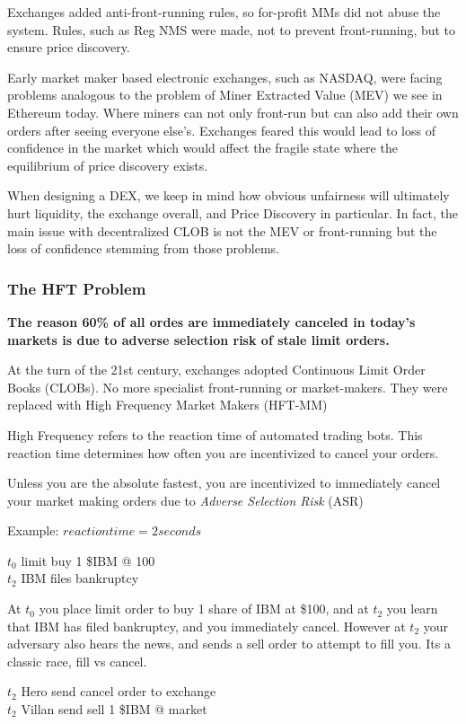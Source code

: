 \documentclass[12pt]{article}
\begin{document}
Exchanges added anti-front-running rules, so for-profit MMs did not abuse the system. Rules, such as Reg NMS were made, not to prevent front-running, but to ensure price discovery.

Early market maker based electronic exchanges, such as NASDAQ, were facing problems analogous to the problem of Miner Extracted Value (MEV) we see in Ethereum today. Where miners can not only front-run but can also add their own orders after seeing everyone else's. Exchanges feared this would lead to loss of confidence in the market which would affect the fragile state where the equilibrium of price discovery exists. 

When designing a DEX, we keep in mind how obvious unfairness will ultimately hurt liquidity, the exchange overall, and Price Discovery in particular. In fact, the main issue with decentralized CLOB is not the MEV or front-running but the loss of confidence stemming from those problems.  


\subsubsection*{The HFT Problem}
\textbf{The reason 60\% of all ordes are immediately canceled in today's markets is due to adverse selection risk of stale limit orders.} 

At the turn of the 21st century, exchanges adopted  Continuous Limit Order Books (CLOBs). No more specialist front-running or market-makers. They were replaced with High Frequency Market Makers (HFT-MM) 

High Frequency refers to the reaction time of automated trading bots. This reaction time determines how often you are incentivized to cancel your orders. 

Unless you are the absolute fastest, you are incentivized to immediately cancel your market making orders due to \emph{Adverse Selection Risk} (ASR)

Example: \( reaction time = 2 seconds \) 

$t_0$ limit buy 1 \$IBM @ 100 \\
$t_2$ IBM files bankruptcy 

At $t_0$ you place limit order to buy 1 share of IBM at \$100, and at $t_2$ you learn that IBM has filed bankruptcy, and you immediately cancel. However at $t_2$ your adversary also hears the news, and sends a sell order to attempt to fill you. Its a classic race, fill vs cancel.

$t_2$ Hero send cancel order to exchange  \\
$t_2$ Villan send sell 1 \$IBM @ market  
\end{document}

